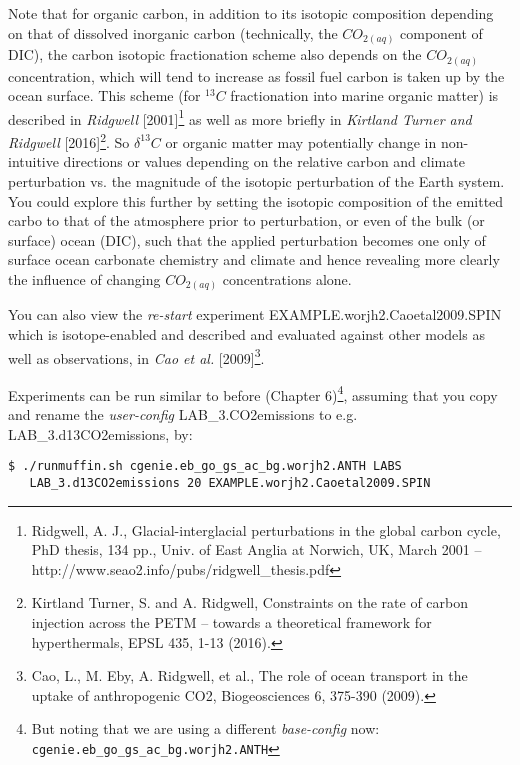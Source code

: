\documentclass[11pt,fleqn]{book} %
\begin{document}
Note that for organic carbon, in addition to its isotopic composition depending on that of dissolved inorganic carbon (technically, the \(CO_{2(aq)}\) component of DIC), the carbon isotopic fractionation scheme also depends on the \(CO_{2(aq)}\) concentration, which will tend to increase as fossil fuel carbon is taken up by the ocean surface. This scheme (for \(^{13}C\) fractionation into marine organic matter) is described in \textit{Ridgwell} [2001]\footnote{Ridgwell, A. J., Glacial-interglacial perturbations in the global carbon cycle, PhD thesis, 134 pp., Univ. of East Anglia at Norwich, UK, March 2001 -- http://www.seao2.info/pubs/ridgwell\_thesis.pdf} as well as more briefly in \textit{Kirtland Turner and Ridgwell} [2016]\footnote{Kirtland Turner, S. and A. Ridgwell, Constraints on the rate of carbon injection across the PETM – towards a theoretical framework for hyperthermals, EPSL 435, 1-13 (2016).}. So \(\delta^{13}C\) or organic matter may potentially change in non-intuitive directions or values depending on the relative carbon and climate perturbation vs. the magnitude of the isotopic perturbation of the Earth system. You could explore this further by setting the isotopic composition of the emitted carbo to that of the atmosphere prior to perturbation, or even of the bulk (or surface) ocean (DIC), such that the applied perturbation becomes one only of surface ocean carbonate chemistry and climate and hence revealing more clearly the influence of changing  \(CO_{2(aq)}\) concentrations alone.

You can also view the \textit{re-start} experiment \textsf{\footnotesize EXAMPLE.worjh2.Caoetal2009.SPIN} which is isotope-enabled and described and evaluated against other models as well as observations, in \textit{Cao et al.} [2009]\footnote{Cao, L., M. Eby, A. Ridgwell, et al., The role of ocean transport in the uptake of anthropogenic CO2, Biogeosciences 6, 375-390 (2009).}.

Experiments can  be run similar to before (Chapter 6)\footnote{But noting that we are using a different \textit{base-config} now: \texttt{cgenie.eb\_go\_gs\_ac\_bg.worjh2.ANTH}}, assuming that you copy and rename the \textit{user-config} \textsf{\footnotesize LAB\_3.CO2emissions} to e.g. \textsf{\footnotesize LAB\_3.d13CO2emissions}, by:
\vspace{-2pt}\begin{verbatim}
$ ./runmuffin.sh cgenie.eb_go_gs_ac_bg.worjh2.ANTH LABS
   LAB_3.d13CO2emissions 20 EXAMPLE.worjh2.Caoetal2009.SPIN
\end{verbatim}\vspace{-2pt}
\end{document}
